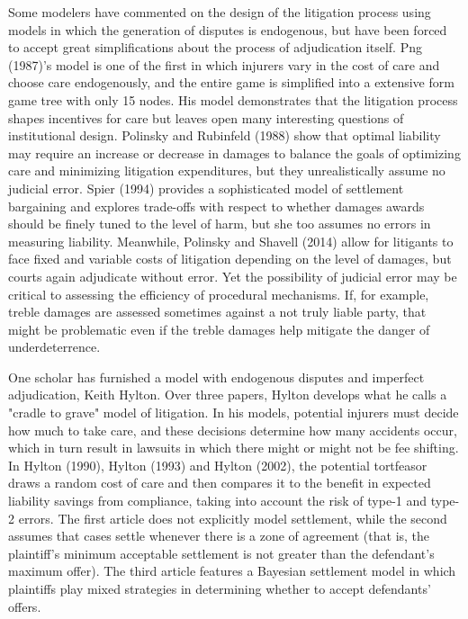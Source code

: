 \documentclass{article}
\begin{document}
Some modelers have commented on the design of the litigation process using models in which the generation of disputes is endogenous, but have been forced to accept great simplifications about the process of adjudication itself. Png (1987)'s model is one of the first in which injurers vary in the cost of care and choose care endogenously, and the entire game is simplified into a extensive form game tree with only 15 nodes. His model demonstrates that the litigation process shapes incentives for care but leaves open many interesting questions of institutional design. Polinsky and Rubinfeld (1988) show that optimal liability may require an increase or decrease in damages to balance the goals of optimizing care and minimizing litigation expenditures, but they unrealistically assume no judicial error. Spier (1994) provides a sophisticated model of settlement bargaining and explores trade-offs with respect to whether damages awards should be finely tuned to the level of harm, but she too assumes no errors in measuring liability. Meanwhile, Polinsky and Shavell (2014) allow for litigants to face fixed and variable costs of litigation depending on the level of damages, but courts again adjudicate without error. Yet the possibility of judicial error may be critical to assessing the efficiency of procedural mechanisms. If, for example, treble damages are assessed sometimes against a not truly liable party, that might be problematic even if the treble damages help mitigate the danger of underdeterrence. 

One scholar has furnished a model with endogenous disputes and imperfect adjudication, Keith Hylton. Over three papers, Hylton develops what he calls a "cradle to grave" model of litigation. In his models, potential injurers must decide how much to take care, and these decisions determine how many accidents occur, which in turn result in lawsuits in which there might or might not be fee shifting. In Hylton (1990), Hylton (1993) and Hylton (2002), the potential tortfeasor draws a random cost of care and then compares it to the benefit in expected liability savings from compliance, taking into account the risk of type-1 and type-2 errors. The first article does not explicitly model settlement, while the second assumes that cases settle whenever there is a zone of agreement (that is, the plaintiff's minimum acceptable settlement is not greater than the defendant's maximum offer). The third article features a Bayesian settlement model in which plaintiffs play mixed strategies in determining whether to accept defendants' offers.  
\end{document}
